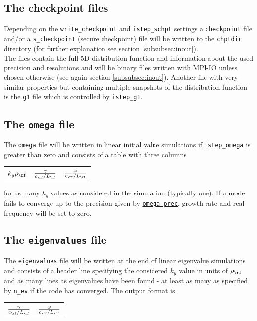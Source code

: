 \documentclass[12pt]{article}
\begin{document}
\subsection{The checkpoint files}
\label{subsec:chpt-files}
Depending on the {\tt write\_checkpoint} and {\tt istep\_schpt} settings a {\tt checkpoint} file
and/or a {\tt s\_checkpoint} (secure checkpoint) file will be written to the {\tt chptdir}
directory (for further explanation see section \ref{subsubsec:inout}). \\
The files contain the full 5D distribution function and information about the used precision and
resolutions and will be binary files written with MPI-IO unless chosen otherwise
(see again section \ref{subsubsec:inout}). Another file with very similar properties but
containing multiple snapshots of the distribution function is the {\tt g1} file which is
controlled by {\tt istep\_g1}.

\subsection{The \texttt{omega} file}
\label{subsec:omega-file}

The {\tt omega} file will be written in linear initial value simulations
if \hyperlink{istep_omega}{\tt istep\_omega} is greater than
zero and consists of a table with three columns
\begin{center}
\begin{tabular}{lll}
$k_y\rho_\rf$ & $\frac{\gamma}{c_\rf/L_\rf}$ & $\frac{\omega}{c_\rf / L_\rf}$
\end{tabular}
\end{center}
for as many $k_y$ values as considered in the simulation (typically one).
If a mode fails to converge up to the precision given by \hyperlink{omega_prec}{\tt omega\_prec},
growth rate and real frequency will be set to zero.

\subsection{The \texttt{eigenvalues} file}
\label{subsec:eigenvalues-file}

The {\tt eigenvalues} file will be written at the end of linear eigenvalue simulations
and consists of a header line specifying the considered $k_y$ value in units of $\rho_\rf$ and
as many lines as eigenvalues have been found - at least as many as specified by {\tt n\_ev}
if the code has converged. The output format is
\begin{center}
\begin{tabular}{ll}
$\frac{\gamma}{c_\rf/L_\rf}$ & $\frac{\omega}{c_\rf / L_\rf}$
\end{tabular}
\end{center}
\end{document}
